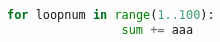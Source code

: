 \documentclass[]{article}
\begin{document}
	\begin{linenumbers}
		\begin{lstlisting}[language=Python]
			for loopnum in range(1..100):
				sum += aaa
		\end{lstlisting}
	\end{linenumbers}
	
	
\end{document}
